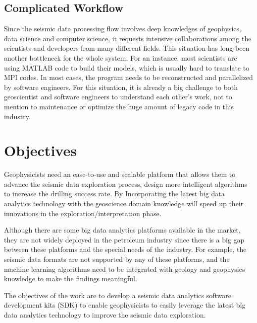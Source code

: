 \subsection{Complicated Workflow}
Since the seismic data processing flow involves deep knowledges of geophysics, data science and computer science, it requests intensive collaborations among the scientists and developers from many different fields. This situation has long been another bottleneck for the whole system. For an instance, most scientists are using MATLAB code to build their models, which is usually hard to translate to MPI codes. In most cases, the program needs to be reconstructed and parallelized by software engineers. For this situation, it is already a big challenge to both geoscientist and software engineers to understand each other's work, not to mention to maintenance or optimize the huge amount of legacy code in this industry.


\section{Objectives}

Geophysicists need an ease-to-use and scalable platform that allows them to advance the seismic data exploration process, design more intelligent algorithms to increase the drilling success rate. By Incorporating the latest big data analytics technology with the geoscience domain knowledge will speed up their innovations in the exploration/interpretation phase.

Although there are some big data analytics platforms available in the market, they are not widely deployed in the petroleum industry since there is a big gap between these platforms and the special needs of the industry. For example, the seismic data formats are not supported by any of these platforms, and the machine learning algorithms need to be integrated with geology and geophysics knowledge to make the findings meaningful.

The objectives of the work are to develop a seismic data analytics software development kits (SDK) to enable geophysicists to easily leverage the latest big data analytics technology to improve the seismic data exploration.




